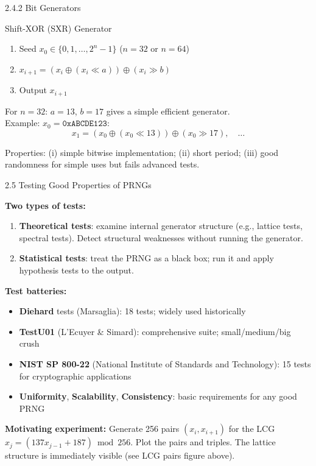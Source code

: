 \documentclass[aspectratio=169,10pt]{beamer}
\begin{document}
\begin{frame}[allowframebreaks]{2.4.2 Bit Generators}
\begin{block}{Shift-XOR (SXR) Generator}
\begin{enumerate}
  \item Seed $x_0 \in \{0,1,\ldots,2^n-1\}$ ($n=32$ or $n=64$)
  \item $x_{i+1} = (x_i \oplus (x_i \ll a)) \oplus (x_i \gg b)$
  \item Output $x_{i+1}$
\end{enumerate}
For $n=32$: $a=13$, $b=17$ gives a simple efficient generator.\\
Example: $x_0 = \texttt{0xABCDE123}$:
\[
  x_1 = (x_0 \oplus (x_0 \ll 13)) \oplus (x_0 \gg 17), \quad \ldots
\]
\end{block}

Properties: (i) simple bitwise implementation; (ii) short period; (iii) good
randomness for simple uses but fails advanced tests.

\end{frame}

\begin{frame}[allowframebreaks]{2.5 Testing Good Properties of PRNGs}

\textbf{Two types of tests:}
\begin{enumerate}
  \item \textbf{Theoretical tests}: examine internal generator structure (e.g.,
    lattice tests, spectral tests). Detect structural weaknesses without running the generator.
  \item \textbf{Statistical tests}: treat the PRNG as a black box; run it and apply
    hypothesis tests to the output.
\end{enumerate}

\medskip
\textbf{Test batteries:}
\begin{itemize}
  \item \textbf{Diehard} tests (Marsaglia): 18 tests; widely used historically
  \item \textbf{TestU01} (L'Ecuyer \& Simard): comprehensive suite; small/medium/big crush
  \item \textbf{NIST SP 800-22} (National Institute of Standards and Technology):
    15 tests for cryptographic applications
  \item \textbf{Uniformity}, \textbf{Scalability}, \textbf{Consistency}:
    basic requirements for any good PRNG
\end{itemize}

\medskip
\textbf{Motivating experiment:} Generate 256 pairs $(x_i, x_{i+1})$ for the LCG
$x_j = (137 x_{j-1} + 187) \bmod 256$. Plot the pairs and triples. The lattice
structure is immediately visible (see LCG pairs figure above).

\end{frame}
\end{document}

